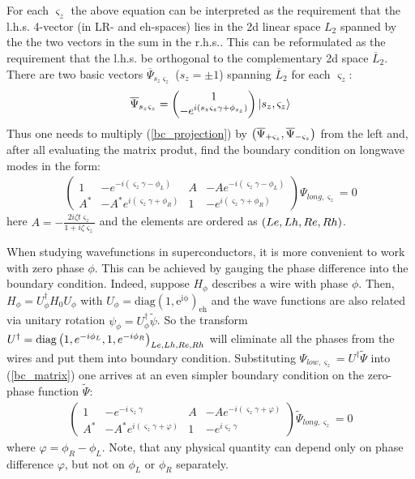 For each $ \varsigma_z $ the above equation can be interpreted as the requirement that the l.h.s. 4-vector (in LR- and eh-spaces) lies in the 2d linear space $ L_{2} $ spanned by the the two vectors in the sum in the r.h.s.. This can be reformulated as the requirement that the l.h.s. be orthogonal to the complementary 2d space $ \overline{L}_{2} $. There are two basic vectors $ \overline{\Psi}_{s_z\varsigma_{z}} $ ($ s_z=\pm1 $) spanning $ \overline{L}_{2} $ for each $ \varsigma_z $:
\begin{gather}
	\overline{\Psi}_{s_z\varsigma_{z}}
	=
	\begin{pmatrix}
	1 \\
	-e^{
		i\left(
			s_z\varsigma_z\gamma
			+
			\phi_{s_z}
			\right)
		}
	\end{pmatrix}
	\ket{s_z,\varsigma_z}
\end{gather}
Thus one needs to multiply (\ref{bc_projection}) by $ \left(\overline{\Psi}_{+\varsigma_{z}},\overline{\Psi}_{-\varsigma_{z}}\right) $ from the left and, after all evaluating the matrix produt, find the boundary condition on longwave modes in the form:
\begin{gather}
\label{bc_matrix}
\begin{pmatrix}1 & -e^{-i\left(\varsigma_{z}\gamma-\phi_L\right)} & A & -Ae^{-i\left(\varsigma_{z}\gamma-\phi_L\right)}\\
A^{*} & -A^{*}e^{i\left(\varsigma_{z}\gamma+\phi_R\right)} & 1 & -e^{i\left(\varsigma_{z}\gamma+\phi_R\right)}
\end{pmatrix}\Psi_{long, \varsigma_{z}}=0
\end{gather}
here $ A=-\frac{2i\zeta t\varsigma_z}{1+i\zeta\varsigma_z} $ and the elements are ordered as $ \left(Le,Lh,Re,Rh\right) $.

When studying wavefunctions in superconductors, it is more convenient to work with zero phase $ \phi $. This can be achieved by gauging the phase difference into the boundary condition. Indeed, suppose $ H_{\phi} $ describes a wire with phase $ \phi $. Then, $ H_{\phi}=U_{\phi}^{\dagger}H_{0}U_{\phi} $ with $ U_{\phi}=\mathrm{diag(1,e^{i\phi})_{eh}} $ and the wave functions are also related via unitary rotation $ \psi_{\phi}=U_{\phi}^{\dagger}\tilde{\psi} $. So the transform $ U^{\dagger}=\mathrm{diag}\left(1,e^{-i\phi_L},1,e^{-i\phi_R }\right)_{Le,Lh,Re,Rh}$  will eliminate all the phases from the wires and put them into boundary condition. Substituting $ \Psi_{low,\varsigma_{z}}=U^{\dagger}\tilde{\Psi} $ into (\ref{bc_matrix}) one arrives at an even simpler boundary condition on the zero-phase function $ \tilde{\Psi} $:
\begin{gather}
\label{bc_matrix_phases}
\begin{pmatrix}1 & -e^{-i\varsigma_{z}\gamma} & A & -Ae^{-i\left(\varsigma_{z}\gamma+\varphi\right)}\\
A^{*} & -A^{*}e^{i\left(\varsigma_{z}\gamma+\varphi\right)} & 1 & -e^{i\varsigma_{z}\gamma}
\end{pmatrix}
\tilde{\Psi}_{long, \varsigma_{z}}=0
\end{gather}
where $ \varphi=\phi_R-\phi_L $. Note, that any physical quantity can depend only on phase difference $ \varphi $,  but not on $ \phi_L $ or $ \phi_R $ separately.

